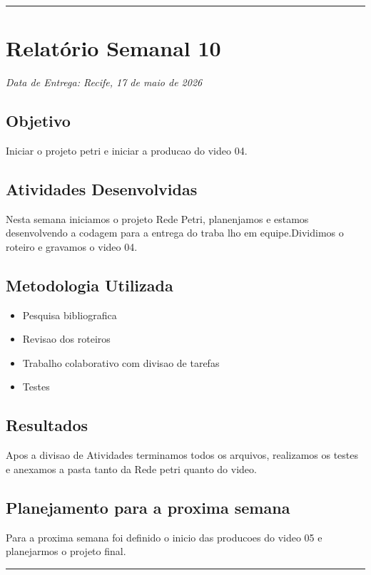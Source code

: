 \bigskip
\hrule
\bigskip

\section{Relatório Semanal 10}
{\centering\noindent\textit{Data de Entrega: Recife, 17 de maio de 2026}\par}\bigskip

\subsection{Objetivo}
Iniciar o projeto petri e iniciar a producao do video 04.

\subsection{Atividades Desenvolvidas}
Nesta semana iniciamos o projeto Rede Petri, planenjamos e estamos desenvolvendo a codagem para a entrega do traba
lho em equipe.Dividimos o roteiro e gravamos o video 04.

\subsection{Metodologia Utilizada}
\begin{itemize}
    \item Pesquisa bibliografica
    \item Revisao dos roteiros
    \item Trabalho colaborativo com divisao de tarefas
    \item Testes
\end{itemize}

\subsection{Resultados}
Apos a divisao de Atividades terminamos todos os arquivos, realizamos os testes e anexamos a pasta tanto da Rede
petri quanto do video.

\subsection{Planejamento para a proxima semana}
Para a proxima semana foi definido o inicio das producoes do video 05 e planejarmos o projeto final.

\bigskip
\hrule
\bigskip
